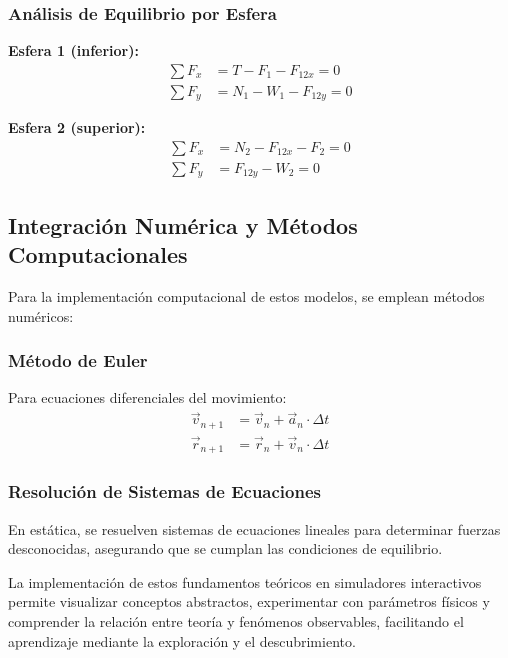 \subsubsection{Análisis de Equilibrio por Esfera}

\textbf{Esfera 1 (inferior):}
\begin{align}
\sum F_x &= T - F_1 - F_{12x} = 0 \\
\sum F_y &= N_1 - W_1 - F_{12y} = 0
\end{align}

\textbf{Esfera 2 (superior):}
\begin{align}
\sum F_x &= N_2 - F_{12x} - F_2 = 0 \\
\sum F_y &= F_{12y} - W_2 = 0
\end{align}

\subsection{Integración Numérica y Métodos Computacionales}

Para la implementación computacional de estos modelos, se emplean métodos numéricos:

\subsubsection{Método de Euler}
Para ecuaciones diferenciales del movimiento:
\begin{align}
\vec{v}_{n+1} &= \vec{v}_n + \vec{a}_n \cdot \Delta t \\
\vec{r}_{n+1} &= \vec{r}_n + \vec{v}_n \cdot \Delta t
\end{align}

\subsubsection{Resolución de Sistemas de Ecuaciones}
En estática, se resuelven sistemas de ecuaciones lineales para determinar fuerzas desconocidas, asegurando que se cumplan las condiciones de equilibrio.

La implementación de estos fundamentos teóricos en simuladores interactivos permite visualizar conceptos abstractos, experimentar con parámetros físicos y comprender la relación entre teoría y fenómenos observables, facilitando el aprendizaje mediante la exploración y el descubrimiento.